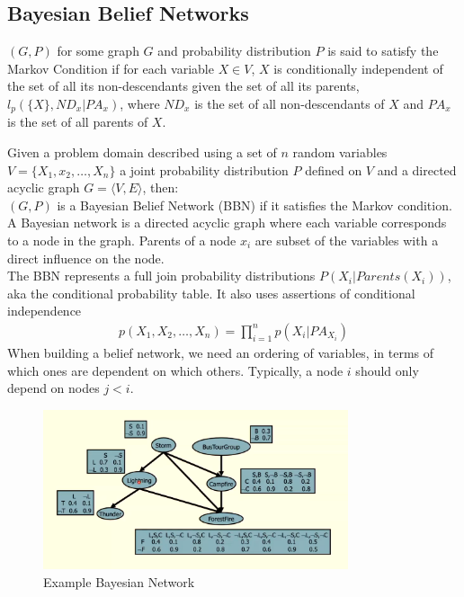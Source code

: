 \documentclass[a4paper]{article}
\theoremstyle{plain}
\theoremstyle{definition}
\newtheorem{defn}{Definition}[section]
\theoremstyle{remark}
\begin{document}
\subsection{Bayesian Belief Networks}
\begin{tcolorbox}[colback=black!3!white,colframe=black!60!white,title=\begin{defn}Markov Condition \label{Markov Condition}\end{defn}]
$(G,P)$ for some graph $G$ and probability distribution $P$ is said to satisfy the Markov Condition if for each variable $X \in V$, $X$ is conditionally independent of the set of all its non-descendants given the set of all its parents, $l_p(\{X\},ND_x|PA_x)$, where $ND_x$ is the set of all non-descendants of $X$ and $PA_x$ is the set of all parents of $X$.
\end{tcolorbox}
Given a problem domain described using a set of $n$ random variables $V=\{X_1,x_2,\ldots,X_n\}$ a joint probability distribution $P$ defined on $V$ and a directed acyclic graph $G=\langle V,E\rangle$, then:\\
$(G,P)$ is a Bayesian Belief Network (BBN) if it satisfies the Markov condition. A Bayesian network is a directed acyclic graph where each variable corresponds to a node in the graph. Parents of a node $x_i$ are subset of the variables with a direct influence on the node. \\
The BBN represents a full join probability distributions $P(X_i|Parents(X_i))$, aka the conditional probability table. It also uses assertions of conditional independence
\begin{align*}
	p(X_1,X_2,\ldots,X_n) = \prod_{i=1}^{n} p(X_i|PA_{X_i}) 
\end{align*}
When building a belief network, we need an ordering of variables, in terms of which ones are dependent on which others. Typically, a node $i$ should only depend on nodes $j<i$.
\begin{figure}[H]
	\centering
	\includegraphics[width=0.8\textwidth]{bay.png}
	\caption{Example Bayesian Network}
	\label{fig:bay-png}
\end{figure}
\end{document}

